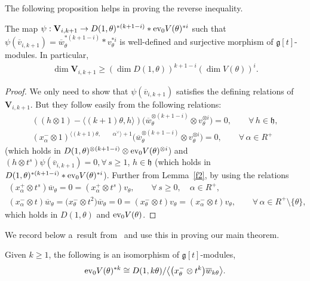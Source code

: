 The following proposition helps in proving the reverse inequality.
\begin{proposition}
The map $\psi :\mathbf{V}_{i,k+1}\rightarrow D(1,\theta)^{* (k+1-i)} * \textup{ev}_0 V(\theta)^{*i}$ such that
$\psi(\overline{v}_{i,k+1}) = \overline{w}_{\theta}^{* (k+1-i)} * v_{\theta}^{*i}$ is well-defined and surjective
morphism of $\mathfrak{g}[t]$-modules.
In particular,
\begin{gather}
\label{dimg}
\dim \mathbf{V}_{i,k+1}\geq (\dim D(1, \theta))^{k+1-i} (\dim V(\theta))^{i}.
\end{gather}
\end{proposition}
\begin{proof}
We only need to show that $\psi(\overline{v}_{i,k+1})$ satisf\/ies the def\/ining relations of $\mathbf{V}_{i,k+1}$. But
they follow easily from the following relations:
\begin{gather*}
((h \otimes 1)-\langle (k+1)\theta, h\rangle)\big(\overline{w}_{\theta}^{\otimes (k+1-i)} \otimes v_{\theta}^{\otimes i}\big)=0,
\qquad
\forall\, h\in\mathfrak{h},
\\
(x^{-}_{\alpha}\otimes 1)^{\langle (k+1)\theta,
\qquad
\alpha^{\vee} \rangle + 1}\big(\overline{w}_{\theta}^{\otimes (k+1-i)}\otimes v_{\theta}^{\otimes i}\big)=0,
\qquad
\forall\, \alpha\in R^{+}
\end{gather*}
(which holds in $D(1,\theta)^{\otimes (k+1-i)} \otimes \textup{ev}_0 V(\theta)^{\otimes i}$) and $(h \otimes
t^s)\psi(\overline{v}_{i,k+1})=0, \forall\, s\geq 1$, $h\in\mathfrak{h}$
(which holds in $D(1,\theta)^{* (k+1-i)}*\textup{ev}_0 V(\theta)^{*i}$).
Further from Lemma~\ref{f2}, by using the relations
\begin{gather*}
(x^{+}_{\alpha}\otimes t^s)\overline{w}_{\theta}=0=(x^{+}_{\alpha}\otimes t^s)v_{\theta},
\qquad
\forall\, s\geq 0, \quad \alpha\in R^{+},
\\
(x^{-}_{\alpha}\otimes t)\overline{w}_{\theta}=\big(x^{-}_{\theta}\otimes
t^{2}\big)\overline{w}_{\theta}=0=(x^{-}_{\theta}\otimes t)v_{\theta}=(x^{-}_{\alpha}\otimes t)v_{\theta},
\qquad
\forall\, \alpha \in R^{+}\setminus\{\theta\},
\end{gather*}
which holds in $D(1,\theta)$ and $\textup{ev}_0 V(\theta)$.
\end{proof}

We record below a~result from~\cite{F} and use this in proving our main theorem.
\begin{proposition}\textup{\cite[Corollary 2]{F}}
\label{F}
Given $k\geq 1$, the following is an isomorphism of $\mathfrak{g}[t]$-modules,
\begin{gather*}
\textup{ev}_0 V(\theta)^{* k} \cong D(1, k\theta)/\big\langle \big({x^{-}_\theta} \otimes t^{k}\big) \overline{w}_{k\theta}\big\rangle.
\end{gather*}
\end{proposition}

